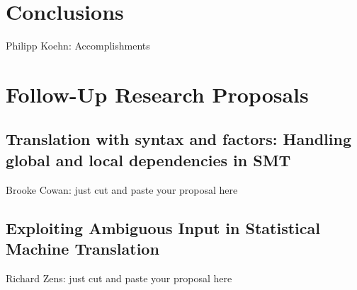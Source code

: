 \documentclass[11pt]{book}
\theoremstyle{plain}
\begin{document}
\chapter{Conclusions}
{\sc Philipp Koehn: Accomplishments}

\appendix

\chapter{Follow-Up Research Proposals}

\section{Translation with syntax and factors: Handling global and local dependencies in SMT}
{\sc Brooke Cowan: just cut and paste your proposal here}

\section{Exploiting Ambiguous Input in Statistical Machine Translation}
{\sc Richard Zens: just cut and paste your proposal here}




\printindex
\end{document}
